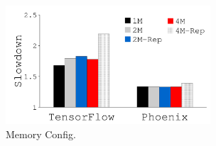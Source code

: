 {
\begin{figure}[h]
\begin{minipage}{3in}
\begin{center}
\centerline{\includegraphics[width=3in]{lego/Figures/g_plot_LEGO_number_memory_rep.pdf}}
\caption[Memory Config.]{Memory Config.}
\label{fig-mem-rep}
\end{center}
\end{minipage}
\end{figure}
}